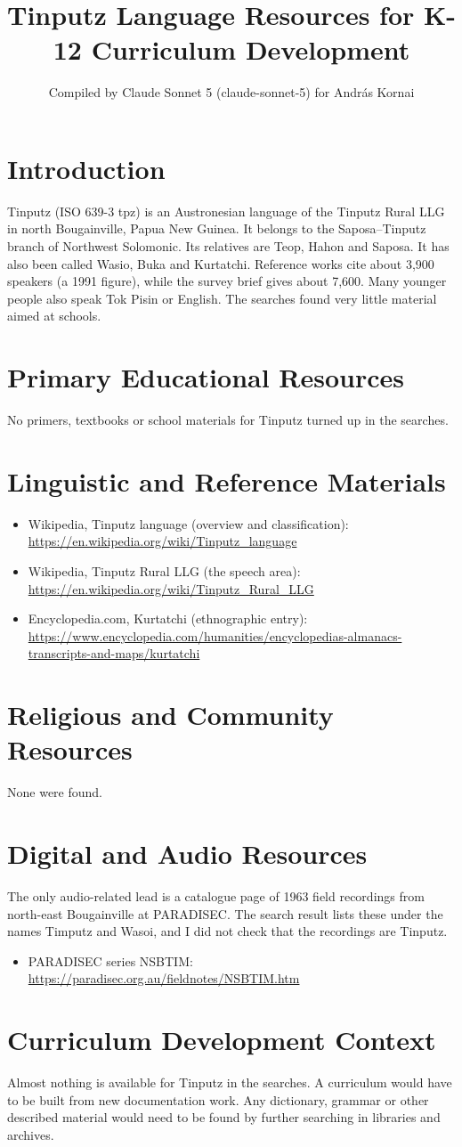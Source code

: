 \documentclass[12pt]{article}
\title{Tinputz Language Resources for K-12 Curriculum Development}
\author{Compiled by Claude Sonnet 5 (claude-sonnet-5) for Andr\'as Kornai}
\date{}
\begin{document}
\maketitle

\section{Introduction}
Tinputz (ISO 639-3 tpz) is an Austronesian language of the Tinputz Rural LLG in north Bougainville, Papua New Guinea. It belongs to the Saposa--Tinputz branch of Northwest Solomonic. Its relatives are Teop, Hahon and Saposa. It has also been called Wasio, Buka and Kurtatchi. Reference works cite about 3,900 speakers (a 1991 figure), while the survey brief gives about 7,600. Many younger people also speak Tok Pisin or English. The searches found very little material aimed at schools.

\section{Primary Educational Resources}
No primers, textbooks or school materials for Tinputz turned up in the searches.

\section{Linguistic and Reference Materials}
\begin{itemize}
\item Wikipedia, Tinputz language (overview and classification): \url{https://en.wikipedia.org/wiki/Tinputz_language}
\item Wikipedia, Tinputz Rural LLG (the speech area): \url{https://en.wikipedia.org/wiki/Tinputz_Rural_LLG}
\item Encyclopedia.com, Kurtatchi (ethnographic entry): \url{https://www.encyclopedia.com/humanities/encyclopedias-almanacs-transcripts-and-maps/kurtatchi}
\end{itemize}

\section{Religious and Community Resources}
None were found.

\section{Digital and Audio Resources}
The only audio-related lead is a catalogue page of 1963 field recordings from north-east Bougainville at PARADISEC. The search result lists these under the names Timputz and Wasoi, and I did not check that the recordings are Tinputz.
\begin{itemize}
\item PARADISEC series NSBTIM: \url{https://paradisec.org.au/fieldnotes/NSBTIM.htm}
\end{itemize}

\section{Curriculum Development Context}
Almost nothing is available for Tinputz in the searches. A curriculum would have to be built from new documentation work. Any dictionary, grammar or other described material would need to be found by further searching in libraries and archives.
\end{document}
